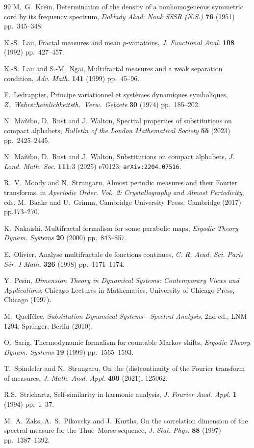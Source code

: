 \documentclass[11pt,reqno]{amsart}
\theoremstyle{plain}
\theoremstyle{definition}
\newcommand{\ts}{\hspace{0.5pt}}
\begin{document}
\begin{thebibliography}{99}
M.~G.~Kre\u{\i}n, 
Determination of the density of a nonhomogeneous symmetric cord by its frequency spectrum,
\textit{Doklady Akad. Nauk SSSR (N.S.)}
\textbf{76} (1951) pp.~345--348.

K.-S.~Lau, 
Fractal measures and mean $p$-variations, 
\textit{J. Functional Anal.} \textbf{108} (1992) pp.~427--457.

K.-S.~Lau and S.-M.~Ngai, 
Multifractal measures and a weak separation
condition, 
\textit{Adv. Math.} \textbf{141} (1999) pp.~45--96.


F.~Ledrappier,
Principe variationnel et syst\`emes dynamiques symboliques,
\textit{Z.\ Wahrscheinlichkeitsth.\ Verw.\ Gebiete}
\textbf{30} (1974) pp.~185--202.

N.~Mañibo, D.~Rust and J.~Walton,
Spectral properties of substitutions on compact alphabets,
\textit{Bulletin of the London Mathematical Society}  \textbf{55} (2023) pp.~2425--2445.

N.~Mañibo, D.~Rust and J.~Walton,
Substitutions on compact alphabets,
\textit{J. Lond. Math. Soc.} 
\textbf{111}:3 (2025) e70123;
\texttt{arXiv:2204.07516}.


R.~V.~Moody and N.~Strungaru,
Almost periodic measures and their Fourier transforms, in
\textit{Aperiodic Order. Vol.~2: Crystallography and Almost Periodicity}, eds. M.~Baake and U.~Grimm,
Cambridge University Press, Cambridge (2017) pp.173--270.

K.~Nakaishi, 
Multifractal formalism for some parabolic maps, 
\textit{Ergodic Theory Dynam. Systems} \textbf{20} (2000) pp.~843--857.

E.~Olivier, Analyse multifractale de fonctions continues, 
\textit{C. R. Acad. Sci. Paris S\'er. I Math.} \textbf{326} (1998) pp.~1171--1174.

Y.~Pesin,
\textit{Dimension Theory in Dynamical Systems:
Contemporary Views and Applications}, Chicago Lectures in Mathematics, University of Chicago Press, Chicago (1997).


M.~Queff\'{e}lec,
\textit{Substitution Dynamical Systems---Spectral Analysis},
2nd ed., LNM 1294, Springer, Berlin (2010).


O.~Sarig,
Thermodynamic formalism for countable Markov shifts,
\textit{Ergodic Theory Dynam. Systems} \textbf{19} (1999) pp.~1565--1593.



T.~Spindeler and N.~Strungaru, 
On the (dis)continuity of the Fourier transform of measures, 
\textit{J. Math. Anal. Appl.} \textbf{499} (2021), 125062.

R.S.~Strichartz,
Self-similarity in harmonic analysis,
\textit{J. Fourier Anal. Appl.}
\textbf{1} (1994) pp.~1--37. 

M.~A.~Zaks, A.~S.~Pikovsky and J.~Kurths,
On the correlation dimension of the spectral measure for the Thue{\ts}--Morse sequence,
\textit{J. Stat. Phys.} \textbf{88} (1997) pp.~1387--1392. 


\end{thebibliography}
\end{document}

